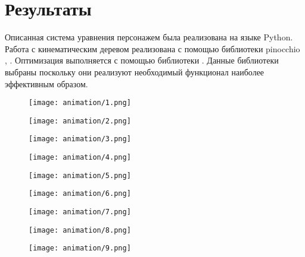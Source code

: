 \section{Результаты}

Описанная система уравнения персонажем была реализована на языке Python. Работа с кинематическим деревом реализована с помощью библиотеки pinocchio \cite{Carpentier}, \cite{Pinocchio}. Оптимизация выполняется с помощью библиотеки \cite{CVXOPT}. Данные библиотеки выбраны поскольку они реализуют необходимый функционал наиболее эффективным образом.

\begin{figure}
  \hfill
  \begin{minipage}{0.326\textwidth}
    \centering
    \texttt{[image: animation/1.png]}
  \end{minipage}
  \begin{minipage}{0.326\textwidth}
    \centering
    \texttt{[image: animation/2.png]}
  \end{minipage}
  \begin{minipage}{0.326\textwidth}
    \centering
    \texttt{[image: animation/3.png]}
  \end{minipage}
  \vfill
  \hfill
  \begin{minipage}{0.326\textwidth}
    \centering
    \texttt{[image: animation/4.png]}
  \end{minipage}
  \begin{minipage}{0.326\textwidth}
    \centering
    \texttt{[image: animation/5.png]}
  \end{minipage}
  \begin{minipage}{0.326\textwidth}
    \centering
    \texttt{[image: animation/6.png]}
  \end{minipage}
  \vfill
  \hfill
  \begin{minipage}{0.326\textwidth}
    \centering
    \texttt{[image: animation/7.png]}
  \end{minipage}
  \begin{minipage}{0.326\textwidth}
    \centering
    \texttt{[image: animation/8.png]}
  \end{minipage}
  \begin{minipage}{0.326\textwidth}
    \centering
    \texttt{[image: animation/9.png]}
  \end{minipage}
  \vfill
  \hfill
  \begin{minipage}{0.326\textwidth}

\end{minipage}
\end{figure}
